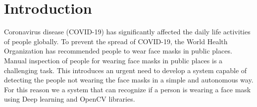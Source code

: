 \section{Introduction} 
Coronavirus disease (COVID-19) has significantly affected the daily life activities of people globally.
To prevent the spread of COVID-19, the World Health Organization has recommended people to wear face masks in public places.
Manual inspection of people for wearing face masks in public places is a challenging task.
This introduces an urgent need to develop a system capable of detecting the people not wearing the face masks in a simple and autonomous way. For this reason we a system that can recognize if a person is wearing a face mask using Deep learning and OpenCV libraries.